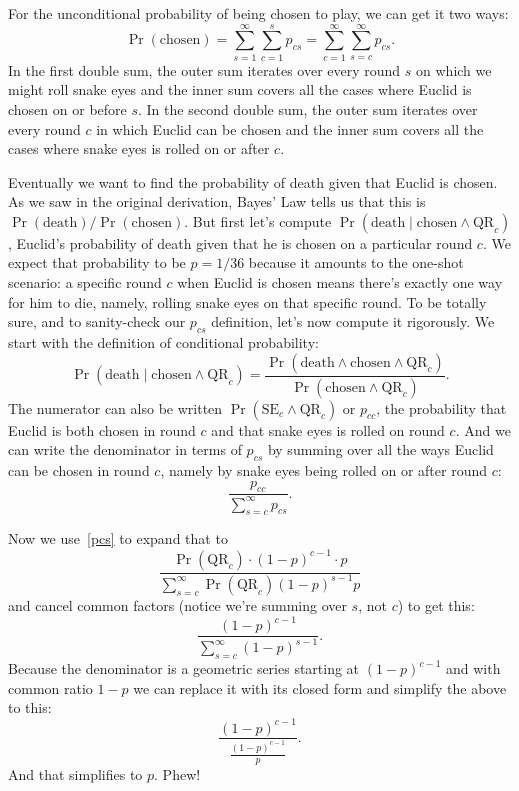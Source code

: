 \documentclass[article,twocolumn]{memoir}
\begin{document}
For the unconditional probability of being chosen to play, we can get it two ways:
\begin{equation}\label{c}
\Pr(\text{chosen}) = 
\sum_{s=1}^\infty\sum_{c=1}^s p_{cs} =
\sum_{c=1}^\infty\sum_{s=c}^\infty p_{cs}.
\end{equation}
In the first double sum, the outer sum iterates over every round $s$ on which we might roll snake eyes and the inner sum covers all the cases where Euclid is chosen on or before $s$.
In the second double sum, the outer sum iterates over every round $c$ in which Euclid can be chosen and the inner sum covers all the cases where snake eyes is rolled on or after $c$.

Eventually we want to find the probability of death given that Euclid is chosen.
As we saw in the original derivation, Bayes' Law tells us that this is
$\Pr(\text{death}) / \Pr(\text{chosen})$.
But first let's compute $\Pr(\text{death}\mid\text{chosen} \land \text{QR}_c)$, Euclid's probability of death given that he is chosen on a particular round $c$.
We expect that probability to be $p=1/36$ because it amounts to the one-shot scenario:
a specific round $c$ when Euclid is chosen means there's exactly one way for him to die, namely, rolling snake eyes on that specific round.
To be totally sure, and to sanity-check our $p_{cs}$ definition, let's now compute it rigorously.
We start with the definition of conditional probability:
$$
\Pr(\text{death}\mid\text{chosen} \land \text{QR}_c) = 
\frac{\Pr(\text{death}\land\text{chosen}\land\text{QR}_c)}{\Pr(\text{chosen}\land\text{QR}_c)}.
$$
The numerator can also be written $\Pr(\text{SE}_c\land\text{QR}_c)$ or
$p_{cc}$, the probability that Euclid is both chosen in round $c$ and that snake eyes is rolled on round $c$.
And we can write the denominator in terms of $p_{cs}$ by summing over all the ways Euclid can be chosen in round $c$, 
namely by snake eyes being rolled on or after round $c$:
\begin{equation}\label{cc}
\frac{p_{cc}}{\sum\limits_{s=c}^\infty p_{cs}}.
\end{equation}

Now we use~\eqref{pcs} to expand that to
$$
\frac{\Pr(\text{QR}_c)\cdot(1-p)^{c-1}\cdot p}{\sum\limits_{s=c}^\infty \Pr(\text{QR}_c)(1-p)^{s-1} p}
$$
and cancel common factors (notice we're summing over $s$, not $c$) to get this:
$$
\frac{(1-p)^{c-1}}{\sum\limits_{s=c}^\infty (1-p)^{s-1}}.
$$
Because the denominator is a geometric series starting at $(1-p)^{c-1}$ and with common ratio $1-p$ we can replace it with its closed form and simplify the above to this:
$$
\frac{(1-p)^{c-1}}{\frac{(1-p)^{c-1}}{p}}.
$$
And that simplifies to $p$.
Phew!
\end{document}
